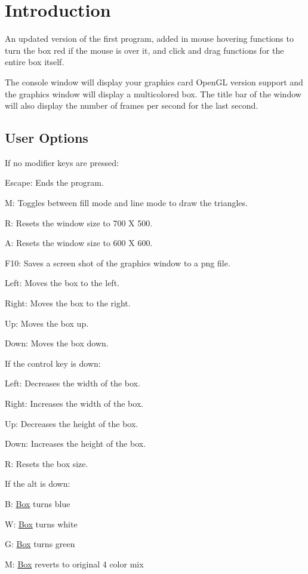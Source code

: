 \hypertarget{index_intro}{}\section{Introduction}\label{index_intro}
An updated version of the first program, added in mouse hovering functions to turn the box red if the mouse is over it, and click and drag functions for the entire box itself.

The console window will display your graphics card Open\+GL version support and the graphics window will display a multicolored box. The title bar of the window will also display the number of frames per second for the last second.\hypertarget{index_options}{}\subsection{User Options}\label{index_options}
If no modifier keys are pressed\+:


\begin{DoxyItemize}
\item Escape\+: Ends the program.
\item M\+: Toggles between fill mode and line mode to draw the triangles.
\item R\+: Resets the window size to 700 X 500.
\item A\+: Resets the window size to 600 X 600.
\item F10\+: Saves a screen shot of the graphics window to a png file.
\item Left\+: Moves the box to the left.
\item Right\+: Moves the box to the right.
\item Up\+: Moves the box up.
\item Down\+: Moves the box down.
\end{DoxyItemize}

If the control key is down\+:


\begin{DoxyItemize}
\item Left\+: Decreases the width of the box.
\item Right\+: Increases the width of the box.
\item Up\+: Decreases the height of the box.
\item Down\+: Increases the height of the box.
\item R\+: Resets the box size.
\end{DoxyItemize}

If the alt is down\+:
\begin{DoxyItemize}
\item B\+: \hyperlink{class_box}{Box} turns blue
\item W\+: \hyperlink{class_box}{Box} turns white
\item G\+: \hyperlink{class_box}{Box} turns green
\item M\+: \hyperlink{class_box}{Box} reverts to original 4 color mix
\end{DoxyItemize}

